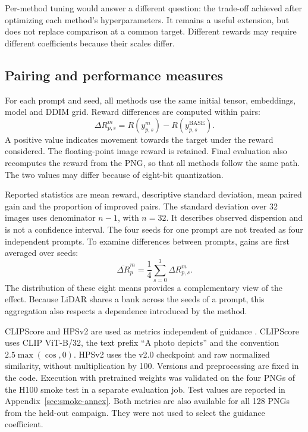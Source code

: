 \documentclass[11pt,a4paper]{article}
\begin{document}
Per-method tuning would answer a different question: the trade-off achieved after optimizing each method's hyperparameters. It remains a useful extension, but does not replace comparison at a common target. Different rewards may require different coefficients because their scales differ.

\subsection{Pairing and performance measures}\label{sec:metrics}
For each prompt and seed, all methods use the same initial tensor, embeddings, model and DDIM grid. Reward differences are computed within pairs:
\begin{equation}
\Delta R_{p,s}^{m}=R(y_{p,s}^{m})-R(y_{p,s}^{\mathrm{BASE}}).
\end{equation}
A positive value indicates movement towards the target under the reward considered. The floating-point image reward is retained. Final evaluation also recomputes the reward from the PNG, so that all methods follow the same path. The two values may differ because of eight-bit quantization.

Reported statistics are mean reward, descriptive standard deviation, mean paired gain and the proportion of improved pairs. The standard deviation over 32 images uses denominator $n-1$, with $n=32$. It describes observed dispersion and is not a confidence interval. The four seeds for one prompt are not treated as four independent prompts. To examine differences between prompts, gains are first averaged over seeds:
\begin{equation}
\overline{\Delta R}_p^{m}=\frac14\sum_{s=0}^{3}\Delta R_{p,s}^{m}.
\end{equation}
The distribution of these eight means provides a complementary view of the effect. Because LiDAR shares a bank across the seeds of a prompt, this aggregation also respects a dependence introduced by the method.

CLIPScore and HPSv2 are used as metrics independent of guidance \cite{clipscore,hps}. CLIPScore uses CLIP ViT-B/32, the text prefix ``A photo depicts'' and the convention $2.5\max(\cos,0)$. HPSv2 uses the v2.0 checkpoint and raw normalized similarity, without multiplication by 100. Versions and preprocessing are fixed in the code. Execution with pretrained weights was validated on the four PNGs of the H100 smoke test in a separate evaluation job. Test values are reported in Appendix~\ref{sec:smoke-annex}. Both metrics are also available for all 128 PNGs from the held-out campaign. They were not used to select the guidance coefficient.
\end{document}
